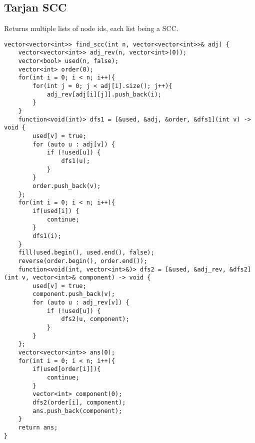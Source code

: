 \documentclass[8pt, headheight=10pt, a4paper]{article}
\begin{document}
\begin{multicols*}{3}
\subsection{Tarjan SCC}
Returns multiple lists of node ids, each list being a SCC. 
\begin{lstlisting}
vector<vector<int>> find_scc(int n, vector<vector<int>>& adj) {
    vector<vector<int>> adj_rev(n, vector<int>(0));
    vector<bool> used(n, false);
    vector<int> order(0);
    for(int i = 0; i < n; i++){
        for(int j = 0; j < adj[i].size(); j++){
            adj_rev[adj[i][j]].push_back(i);
        }
    }
    function<void(int)> dfs1 = [&used, &adj, &order, &dfs1](int v) -> void {
        used[v] = true;
        for (auto u : adj[v]) {
            if (!used[u]) {
                dfs1(u);
            }
        }
        order.push_back(v);
    };
    for(int i = 0; i < n; i++){
        if(used[i]) {
            continue;
        }
        dfs1(i);
    }
    fill(used.begin(), used.end(), false);
    reverse(order.begin(), order.end());
    function<void(int, vector<int>&)> dfs2 = [&used, &adj_rev, &dfs2](int v, vector<int>& component) -> void {
        used[v] = true;
        component.push_back(v);
        for (auto u : adj_rev[v]) {
            if (!used[u]) {
                dfs2(u, component);
            }
        }
    };
    vector<vector<int>> ans(0);
    for(int i = 0; i < n; i++){
        if(used[order[i]]){
            continue;
        }
        vector<int> component(0);
        dfs2(order[i], component);
        ans.push_back(component);
    }
    return ans;
}
\end{lstlisting}


\end{multicols*}
\end{document}
